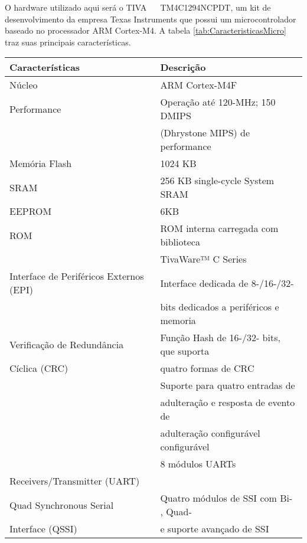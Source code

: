 O hardware utilizado aqui será o  TIVA \texttrademark ~~ TM4C1294NCPDT, um kit de desenvolvimento da empresa Texas Instruments que possui um microcontrolador baseado no processador ARM Cortex-M4. A tabela \ref{tab:CaracteristicasMicro} traz suas principais características.



\begin{longtable}{|l|l|}

\hline
\cellcolor[HTML]{343434} \color[HTML]{FFFFFF} Características & \cellcolor[HTML]{343434} \color[HTML]{FFFFFF} Descrição \\
\hline
Núcleo & ARM Cortex-M4F\\
\hline
Performance & Operação até 120-MHz; 150 DMIPS \\
& (Dhrystone MIPS) de performance \\
\hline
Memória Flash & 1024 KB  \\
\hline
SRAM & 256 KB single-cycle System SRAM \\
\hline
EEPROM & 6KB  \\
\hline
ROM & ROM interna carregada com biblioteca  \\
 & TivaWare™  C Series \\
\hline
Interface de Periféricos Externos (EPI)  & Interface dedicada de 8-/16-/32-   \\ 
 &  bits dedicados a periféricos e memoria\\
\hline
 Verificação de Redundância & Função Hash de 16-/32- bits,  que suporta  \\
  Cíclica (CRC)   & quatro formas de CRC \\
\hline
\begin{comment}
 Função de Adulteração & Suporte para quatro entradas de  \\
 & adulteração e resposta de evento de  \\
 & adulteração configurável configurável  \\
\hline
\end{comment}
Universal Asynchronous  & 8 módulos UARTs \\
Receivers/Transmitter (UART) & \\
\hline
Quad Synchronous Serial & Quatro módulos de SSI com Bi- , Quad-\\
Interface (QSSI) &  e suporte avançado de SSI\\

\end{longtable}
